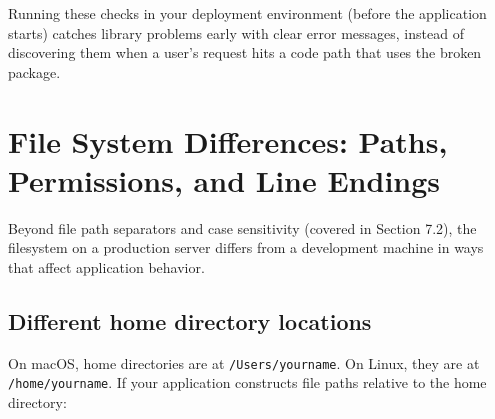 \begin{codebox}[short]

\begin{Shaded}
\begin{Highlighting}[]
  

  

\PreprocessorTok{*}
\end{Highlighting}
\end{Shaded}

\end{codebox}

\noindent{}Running these checks in your deployment environment (before the application starts) catches library problems early with clear error messages, instead of discovering them when a user's request hits a code path that uses the broken package.

\setcounter{section}{4}
\section{File System Differences: Paths, Permissions, and Line Endings}\label{07-environment-drift:75-file-system-differences-paths-permissions-and-line-endings}

Beyond file path separators and case sensitivity (covered in Section 7.2), the filesystem on a production server differs from a development machine in ways that affect application behavior.

\subsection*{Different home directory locations}\label{07-environment-drift:different-home-directory-locations}

On macOS, home directories are at \texttt{/Users/yourname}. On Linux, they are at \texttt{/home/yourname}. If your application constructs file paths relative to the home directory:

